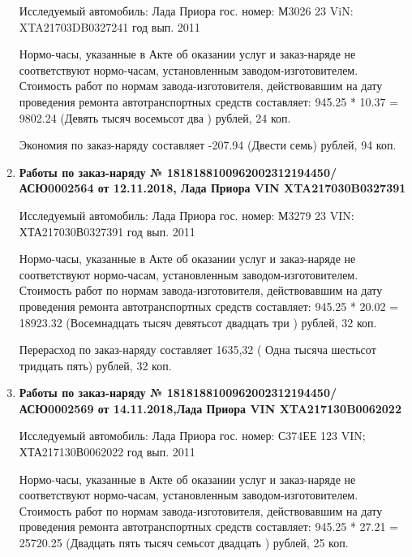 \begin{enumerate}
Исследуемый автомобиль:  Лада Приора гос. номер: М3026 23 ViN: XTA21703DB0327241 год вып. 2011




Нормо-часы, указанные в Акте об оказании услуг и заказ-наряде не соответствуют нормо-часам,  установленным заводом-изготовителем.\\
Стоимость работ по нормам завода-изготовителя, действовавшим на дату проведения ремонта автотранспортных средств составляет: 945.25 * 10.37 = 9802.24 (Девять тысяч восемьсот два ) рублей, 24 коп.

Экономия по заказ-наряду составляет -207.94 (Двести семь) рублей, 94 коп.  
\vspace{3mm}




\item \par\textbf{{Работы по заказ-наряду  № 1818188100962002312194450/\-АСЮ0002564 от 12.11.2018, Лада Приора  VIN  XTA217030B0327391
}}

Исследуемый автомобиль:  Лада Приора гос. номер: М3279 23 VIN: ХТА217030В0327391 год вып. 2011





Нормо-часы, указанные в Акте об оказании услуг и заказ-наряде не соответствуют нормо-часам,  установленным заводом-изготовителем.\\
Стоимость работ по нормам завода-изготовителя, действовавшим на дату проведения ремонта автотранспортных средств составляет: 945.25 * 20.02 = 18923.32 (Восемнадцать тысяч девятьсот двадцать три ) рублей, 32 коп.

Перерасход по заказ-наряду составляет 1635,32 ( Одна тысяча шестьсот тридцать пять) рублей, 32 коп.  
\vspace{3mm}




\item \par\textbf{{Работы по заказ-наряду  № 1818188100962002312194450/\-АСЮ0002569 от 14.11.2018,Лада Приора  VIN XTA217130B0062022
}}

Исследуемый автомобиль:  Лада Приора гос. номер: С374ЕЕ 123 VIN; ХТА217130В0062022 год вып. 2011




Нормо-часы, указанные в Акте об оказании услуг и заказ-наряде не соответствуют нормо-часам,  установленным заводом-изготовителем.\\
Стоимость работ по нормам завода-изготовителя, действовавшим на дату проведения ремонта автотранспортных средств составляет: 945.25 * 27.21 = 25720.25 (Двадцать пять тысяч семьсот двадцать ) рублей, 25 коп.


\end{enumerate}
